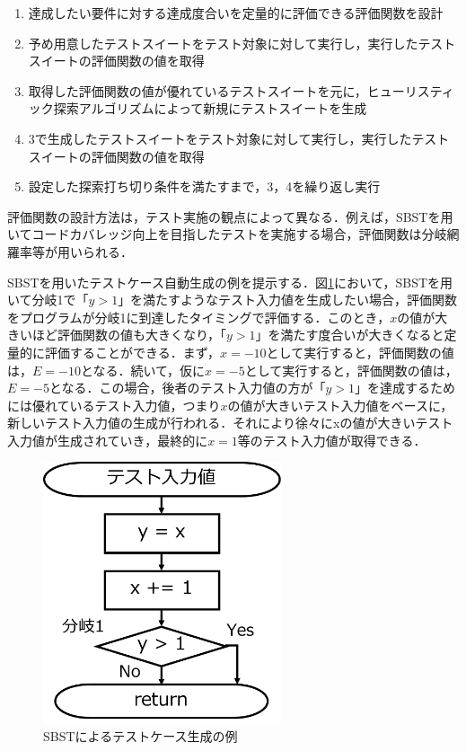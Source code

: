 \documentclass[12pt]{jarticle} %
\begin{document}
\begin{enumerate}
  \item 達成したい要件に対する達成度合いを定量的に評価できる評価関数を設計
  \item 予め用意したテストスイートをテスト対象に対して実行し，実行したテストスイートの評価関数の値を取得
  \item 取得した評価関数の値が優れているテストスイートを元に，ヒューリスティック探索アルゴリズムによって新規にテストスイートを生成
  \item 3で生成したテストスイートをテスト対象に対して実行し，実行したテストスイートの評価関数の値を取得
  \item 設定した探索打ち切り条件を満たすまで，3，4を繰り返し実行
\end{enumerate}

評価関数の設計方法は，テスト実施の観点によって異なる．例えば，SBSTを用いてコードカバレッジ向上を目指したテストを実施する場合，評価関数は分岐網羅率等が用いられる．

SBSTを用いたテストケース自動生成の例を提示する．図\ref{SBST}において，SBSTを用いて分岐1で「$y > 1$」を満たすようなテスト入力値を生成したい場合，評価関数をプログラムが分岐1に到達したタイミングで評価する．このとき，$x$の値が大きいほど評価関数の値も大きくなり，「$y > 1$」を満たす度合いが大きくなると定量的に評価することができる．まず，$x = -10$として実行すると，評価関数の値は，$E = -10$となる．続いて，仮に$x = -5$として実行すると，評価関数の値は，$E = -5$となる．この場合，後者のテスト入力値の方が「$y > 1$」を達成するためには優れているテスト入力値，つまり$x$の値が大きいテスト入力値をベースに，新しいテスト入力値の生成が行われる．それにより徐々にxの値が大きいテスト入力値が生成されていき，最終的に$x = 1$等のテスト入力値が取得できる．

\begin{figure}[htbp]
  \begin{center}
    \includegraphics[clip,width=7cm]{SBST.pdf}
    \caption{SBSTによるテストケース生成の例}
    \label{SBST}
  \end{center}
\end{figure}
\end{document}
